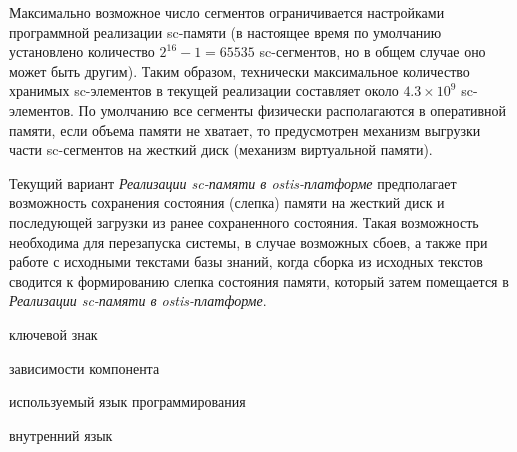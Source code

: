 Максимально возможное число сегментов ограничивается настройками программной реализации sc-памяти (в настоящее время по умолчанию установлено количество $2^{16}-1=65535$ sc-сегментов, но в общем случае оно может быть другим). Таким образом, технически максимальное количество хранимых sc-элементов в текущей реализации составляет около $4.3 \times 10^{9}$ sc-элементов. По умолчанию все сегменты физически располагаются в оперативной памяти, если объема памяти не хватает, то предусмотрен механизм выгрузки части sc-сегментов на жесткий диск (механизм виртуальной памяти).

Текущий вариант \textit{Реализации sc-памяти в ostis-платформе} предполагает возможность сохранения состояния (слепка) памяти на жесткий диск и последующей загрузки из ранее сохраненного состояния. Такая возможность необходима для перезапуска системы, в случае возможных сбоев, а также при работе с исходными текстами базы знаний, когда сборка из исходных текстов сводится к формированию слепка состояния памяти, который затем помещается в \textit{Реализации sc-памяти в ostis-платформе}.

\begin{SCn}
\begin{scnindent}
	\begin{scnreltolist}{ключевой знак}
	\end{scnreltolist}
    \begin{scnindent}
    \end{scnindent}
\end{scnindent}
\begin{scnrelfromset}{зависимости компонента}
\end{scnrelfromset}
\begin{scnrelfromlist}{используемый язык программирования}
\end{scnrelfromlist}
\begin{scnrelfromlist}{внутренний язык}
\end{scnrelfromlist}
\end{SCn}

